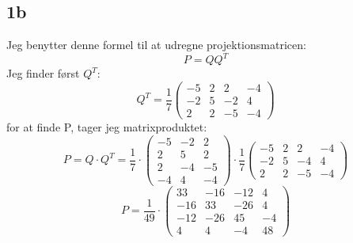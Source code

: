 \documentclass{article}
\begin{document}
\subsection*{1b}
Jeg benytter denne formel til at udregne projektionsmatricen:
$$
P=Q Q^T
$$
Jeg finder først $Q^{T}$:
$$
Q^T=\frac{1}{7}\left(\begin{array}{cccc}
-5 & 2 & 2 & -4 \\
-2 & 5 & -2 & 4 \\
2 & 2 & -5 & -4
\end{array}\right)
$$
for at finde P, tager jeg matrixproduktet:
$$
P=Q \cdot Q^T=\frac{1}{7} \cdot\left(\begin{array}{ccc}
-5 & -2 & 2 \\
2 & 5 & 2 \\
2 & -4 & -5 \\
-4 & 4 & -4
\end{array}\right) \cdot \frac{1}{7}\left(\begin{array}{cccc}
-5 & 2 & 2 & -4 \\
-2 & 5 & -4 & 4 \\
2 & 2 & -5 & -4
\end{array}\right)
$$
$$
P=\frac{1}{49} \cdot\left(\begin{array}{cccc}
33 & -16 & -12 & 4 \\
-16 & 33 & -26 & 4 \\
-12 & -26 & 45 & -4 \\
4 & 4 & -4 & 48
\end{array}\right)
$$
\end{document}

